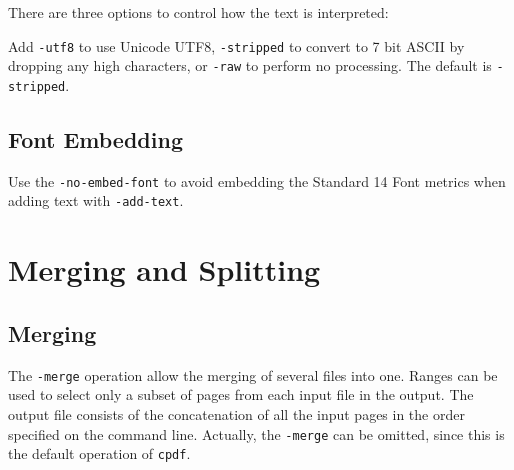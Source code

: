 \documentclass{book}
\newcommand{\cpdf}{\texttt{cpdf}}
\begin{document}
\noindent There are three options to control how the text is interpreted:

\noindent{}

\noindent Add \verb!-utf8! to use Unicode UTF8, \verb!-stripped! to convert to 7
bit ASCII by dropping any high characters, or \verb!-raw! to perform no
processing. The default is \verb!-stripped!.


\section{Font Embedding}
Use the \texttt{-no-embed-font} to avoid embedding the Standard 14 Font metrics when adding text with \texttt{-add-text}.

\chapter{Merging and Splitting}
\noindent{}


  \vspace{12mm}
  \section{Merging}
  The \texttt{-merge} operation allow the merging of several files into one.
Ranges can be used to select only a subset of pages from each
input file in the output. The output file consists of the concatenation of all
the input pages in the order specified on the command line. Actually, the
\texttt{-merge} can be omitted, since this is the default operation of \cpdf.

\noindent{}
\end{document}
